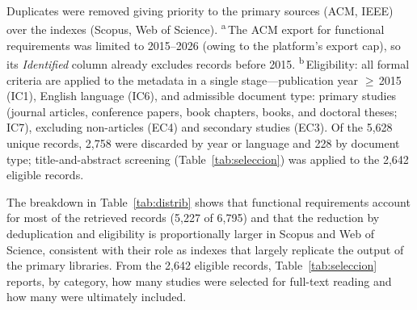 \documentclass[10pt,journal,twoside,letterpaper]{IEEEtran}
\begin{document}
\begin{table}[!tb]
        {\footnotesize Duplicates were removed giving priority to the primary sources (ACM, IEEE) over the indexes (Scopus, Web of Science). \textsuperscript{a}\,The ACM export for functional requirements was limited to 2015--2026 (owing to the platform's export cap), so its \emph{Identified} column already excludes records before 2015. \textsuperscript{b}\,Eligibility: all formal criteria are applied to the metadata in a single stage---publication year $\geq$\,2015 (IC1), English language (IC6), and admissible document type: primary studies (journal articles, conference papers, book chapters, books, and doctoral theses; IC7), excluding non-articles (EC4) and secondary studies (EC3). Of the 5,628 unique records, 2,758 were discarded by year or language and 228 by document type; title-and-abstract screening (Table~\ref{tab:seleccion}) was applied to the 2,642 eligible records.}
    \end{table}
    
    The breakdown in Table~\ref{tab:distrib} shows that functional requirements account for most of the retrieved records (5,227 of 6,795) and that the reduction by deduplication and eligibility is proportionally larger in Scopus and Web of Science, consistent with their role as indexes that largely replicate the output of the primary libraries. From the 2,642 eligible records, Table~\ref{tab:seleccion} reports, by category, how many studies were selected for full-text reading and how many were ultimately included.
    
\end{document}
